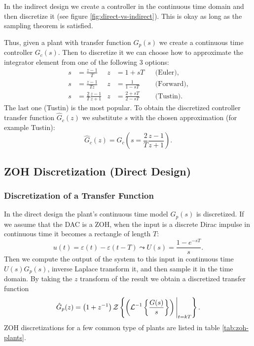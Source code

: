 In the indirect design we create a controller in the continuous time domain and then discretize it (see figure \ref{fig:direct-vs-indirect}). This is okay as long as the sampling theorem is satisfied.

Thus, given a plant with transfer function \(G_p(s)\) we create a continuous time controller \(G_c(s)\). Then to discretize it we can choose how to approximate the integrator element from one of the following 3 options:
\begin{align*}
	s & = \frac{z - 1}{T}                & z & = 1 + sT                && \text{(Euler)},   \\
	s & = \frac{z - 1}{Tz}               & z & = \frac{1}{1 - sT}      && \text{(Forward)}, \\
	s & = \frac{2}{T}\frac{z - 1}{z + 1} & z & = \frac{2 + sT}{2 - sT} && \text{(Tustin)}.
\end{align*}
The last one (Tustin) is the most popular. To obtain the discretized controller transfer function \(\hat{G}_c(z)\) we substitute \(s\) with the chosen approximation (for example Tustin):
\[
	\hat{G}_c(z) = G_c \left(s = \frac{2}{T} \frac{z - 1}{z + 1}\right).
\]

\subsection{ZOH Discretization (Direct Design)}

\subsubsection{Discretization of a Transfer Function}

In the direct design the plant's continuous time model \(G_p(s)\) is discretized. If we assume that the DAC is a ZOH, when the input is a discrete Dirac impulse in continuous time it becomes a rectangle of length \(T\):
\[
	u(t) = \varepsilon(t) - \varepsilon(t - T)
	\leadsto U(s) = \frac{1 - e^{-sT}}{s}.
\]
Then we compute the output of the system to this input in continuous time \(U(s)G_p(s)\), inverse Laplace transform it, and then sample it in the time domain. By taking the \(z\) transform of the result we obtain a discretized transfer function 
\[
	\hat{G}_p(z) = \left( 1 + z^{-1} \right) \operatorname{\mathcal{Z}} \left\{
		\left( \operatorname{\mathcal{L}}^{-1} \left\{
			\frac{G(s)}{s} \right\}
		\right) \Bigg |_{t = kT}
	\right\}.
\]
ZOH discretizations for a few common type of plants are listed in table \ref{tab:zoh-plants}.


